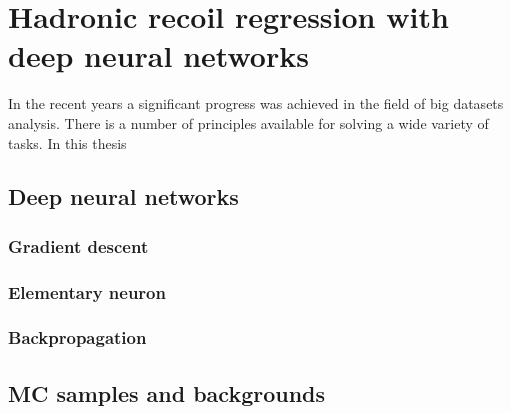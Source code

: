\chapter{Hadronic recoil regression with deep neural networks}
	In the recent years a significant progress was achieved in the field of big datasets analysis. There is a number of principles available for solving a wide variety of tasks. In this thesis 
     \section{Deep neural networks}
     

     
     \subsection{Gradient descent}
     \subsection{Elementary neuron}
     \subsection{Backpropagation}
     \section{MC samples and backgrounds}
     